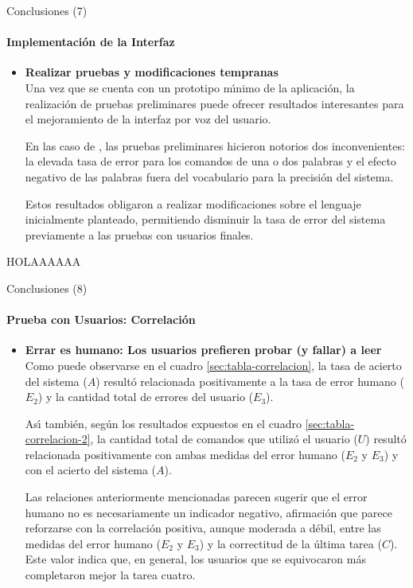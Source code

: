 \begin{frame}{Conclusiones (7)}
\framesubtitle{Implementaci\'on de la Interfaz}
\begin{itemize}

\item{\textbf{Realizar pruebas y modificaciones tempranas\\}}
Una vez que se cuenta con un prototipo m{\'\i}nimo de la aplicaci\'on, la realizaci\'on de pruebas
preliminares puede ofrecer resultados interesantes para el mejoramiento de la 
interfaz por voz del usuario.

En las caso de , las pruebas preliminares hicieron notorios dos
inconvenientes: la elevada tasa de error para los comandos de una o dos palabras
y el efecto negativo de las palabras fuera del vocabulario para la precisi\'on del sistema. 

Estos resultados obligaron a realizar modificaciones sobre el lenguaje inicialmente planteado, 
permitiendo disminuir la tasa de error del sistema previamente a las pruebas con usuarios finales.
\end{itemize}
\end{frame}

HOLAAAAAA

\begin{frame}{Conclusiones (8)}
\framesubtitle{Prueba con Usuarios: Correlaci\'on}
\begin{itemize}
\item{\textbf{Errar es humano: Los usuarios prefieren probar (y fallar) a leer\\}}
Como puede observarse en el cuadro \ref{sec:tabla-correlacion}, la tasa de acierto del 
sistema ($A$) result\'o relacionada positivamente a la tasa de error humano ($E_2$) y la cantidad total de
errores del usuario ($E_3$). 

As{{\'\i}} tambi\'en, según los resultados expuestos en el cuadro \ref{sec:tabla-correlacion-2}, 
la cantidad total de comandos que utiliz\'o el usuario ($U$) result\'o relacionada positivamente con
ambas medidas del error humano ($E_2$ y $E_3$) y con el acierto del sistema ($A$).

Las relaciones anteriormente mencionadas parecen sugerir que el error humano no es necesariamente
un indicador negativo, afirmaci\'on que parece reforzarse con la correlaci\'on positiva, aunque moderada
a d\'ebil, entre las medidas del error humano  ($E_2$ y $E_3$) y la correctitud de la \'ultima 
tarea ($C$). Este valor indica que, en general, los usuarios que se equivocaron m\'as completaron 
mejor la tarea cuatro.
\end{itemize}
\end{frame}


